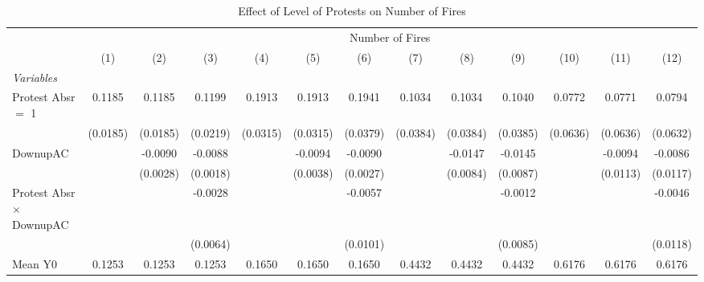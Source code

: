
\begin{table}[htbp]
   \caption{\label{tab:protest_treat_main} Effect of Level of Protests on Number of Fires}
   \centering
   \begin{tabular}{lcccccccccccc}
      \tabularnewline \midrule \midrule
       & \multicolumn{12}{c}{Number of Fires}\\
                                            & (1)           & (2)           & (3)           & (4)           & (5)           & (6)           & (7)           & (8)           & (9)           & (10)          & (11)          & (12)\\  
      \midrule
      \emph{Variables}\\
      Protest Absr $=$ 1                    & 0.1185        & 0.1185        & 0.1199        & 0.1913        & 0.1913        & 0.1941        & 0.1034        & 0.1034        & 0.1040        & 0.0772        & 0.0771        & 0.0794\\   
                                            & (0.0185)      & (0.0185)      & (0.0219)      & (0.0315)      & (0.0315)      & (0.0379)      & (0.0384)      & (0.0384)      & (0.0385)      & (0.0636)      & (0.0636)      & (0.0632)\\   
      DownupAC                              &               & -0.0090       & -0.0088       &               & -0.0094       & -0.0090       &               & -0.0147       & -0.0145       &               & -0.0094       & -0.0086\\   
                                            &               & (0.0028)      & (0.0018)      &               & (0.0038)      & (0.0027)      &               & (0.0084)      & (0.0087)      &               & (0.0113)      & (0.0117)\\   
      Protest Absr $\times$ DownupAC        &               &               & -0.0028       &               &               & -0.0057       &               &               & -0.0012       &               &               & -0.0046\\   
                                            &               &               & (0.0064)      &               &               & (0.0101)      &               &               & (0.0085)      &               &               & (0.0118)\\   
      \hline Mean Y0                        & 0.1253        & 0.1253        & 0.1253        & 0.1650        & 0.1650        & 0.1650        & 0.4432        & 0.4432        & 0.4432        & 0.6176        & 0.6176        & 0.6176\\  

\end{tabular}
\end{table}
